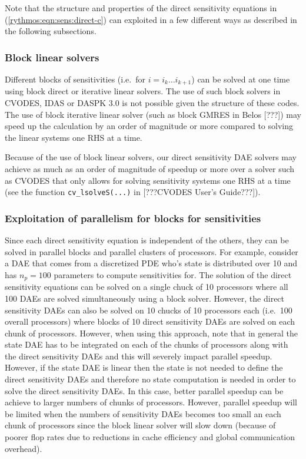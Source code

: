\documentclass[pdf,ps2pdf,11pt]{SANDreport}
\begin{document}
Note that the structure and properties of the direct sensitivity equations in
(\ref{rythmos:eqn:sens:direct-c}) can exploited in a few different ways
as described in the following subsections.

\subsubsection{Block linear solvers}

Different blocks of sensitivities (i.e.\ for $i = i_k {}\ldots i_{k+1}$) can
be solved at one time using block direct or iterative linear solvers.  The use
of such block solvers in CVODES, IDAS or DASPK 3.0 is not possible given the
structure of these codes.  The use of block iterative linear solver (such as
block GMRES in Belos [???])  may speed up the calculation by an order of
magnitude or more compared to solving the linear systems one RHS at a time.

Because of the use of block linear solvers, our direct sensitivity DAE solvers
may achieve as much as an order of magnitude of speedup or more over a solver
such as CVODES that only allows for solving sensitivity systems one RHS at a
time (see the function {}\texttt{cv\_lsolveS(...)} in [???CVODES User's
Guide???]).

\subsubsection{Exploitation of parallelism for blocks for sensitivities}

Since each direct sensitivity equation is independent of the others, they can
be solved in parallel blocks and parallel clusters of processors.  For
example, consider a DAE that comes from a discretized PDE who's state is
distributed over 10 and has $n_p=100$ parameters to compute sensitivities for.
The solution of the direct sensitivity equations can be solved on a single
chuck of 10 processors where all 100 DAEs are solved simultaneously using a
block solver.  However, the direct sensitivity DAEs can also be solved on 10
chucks of 10 processors each (i.e.\ 100 overall processors) where blocks of 10
direct sensitivity DAEs are solved on each chunk of processors.  However, when
using this approach, note that in general the state DAE has to be integrated
on each of the chunks of processors along with the direct sensitivity DAEs and
this will severely impact parallel speedup.  However, if the state DAE is
linear then the state is not needed to define the direct sensitivity DAEs and
therefore no state computation is needed in order to solve the direct
sensitivity DAEs.  In this case, better parallel speedup can be achieve to
larger numbers of chunks of processors.  However, parallel speedup will be
limited when the numbers of sensitivity DAEs becomes too small an each chunk
of processors since the block linear solver will slow down (because of poorer
flop rates due to reductions in cache efficiency and global communication
overhead).
\end{document}
